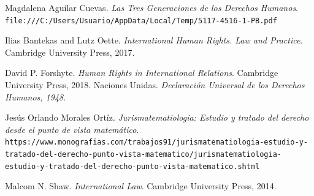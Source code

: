 \documentclass[10pt,a4paper]{article}
\begin{document}
\begin{thebibliography}{9}
Magdalena Aguilar Cuevas.
\textit{Las Tres Generaciones de los Derechos Humanos}.
\\\texttt{file:///C:/Users/Usuario/AppData/Local/Temp/5117-4516-1-PB.pdf
}

Ilias Bantekas and Lutz Oette. 
\textit{International Human Rights. Law and Practice}. 
Cambridge University Press, 2017.
 
David P. Forshyte. 
\textit{Human Rights in International Relations}.
Cambridge University Press, 2018.
Naciones Unidas.
\textit{Declaración Universal de los Derechos Humanos, 1948}.

Jesús Orlando Morales Ortíz.
\textit{Jurismatematiologia: Estudio y tratado del derecho desde el punto de vista matemático}.
\\\texttt{https://www.monografias.com/trabajos91/jurismatematiologia-estudio-y-tratado-del-derecho-punto-vista-matematico/jurismatematiologia-estudio-y-tratado-del-derecho-punto-vista-matematico.shtml
}
 
Malcom N. Shaw.
\textit{International Law}.
Cambridge University Press, 2014.
\end{thebibliography}
\end{document}
